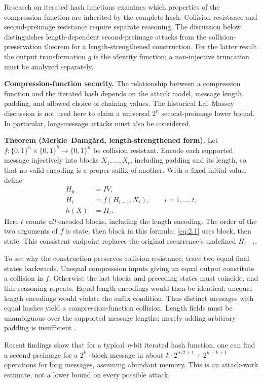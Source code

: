 Research on iterated hash functions examines which properties of the
compression function are inherited by the complete hash. Collision
resistance and second-preimage resistance require separate reasoning.
The discussion below distinguishes length-dependent second-preimage
attacks from the collision-preservation theorem for a length-strengthened
construction. For the latter result the output transformation $g$ is the
identity function; a non-injective truncation must be analyzed separately.

\textbf{Compression-function security.} The relationship between a
compression function and the iterated hash depends on the attack model,
message length, padding, and allowed choice of chaining values. The historical
Lai--Massey discussion \cite{ref29} is not used here to claim a universal
$2^n$ second-preimage lower bound. In particular, long-message attacks
\cite{ref11} must also be considered.

\textbf{Theorem (Merkle--Damg\aa rd, length-strengthened form).}
Let $f:\{0,1\}^n\times\{0,1\}^b\to\{0,1\}^n$ be collision resistant.
Encode each supported message injectively into blocks $X_1,\ldots,X_t$,
including padding and its length, so that no valid encoding is a proper
suffix of another. With a fixed initial value, define
\begin{equation}\label{eq:2.2}
\begin{aligned}
H_0&=IV,\\
H_i&=f(H_{i-1},X_i),\qquad i=1,\ldots,t,\\
h(X)&=H_t.
\end{aligned}
\end{equation}
Here $t$ counts \emph{all} encoded blocks, including the length encoding.
The order of the two arguments of $f$ is state, then block in this formula;
\eqref{eq:2.1} uses block, then state. This consistent endpoint replaces the
original recurrence's undefined $H_{t+1}$.

To see why the construction preserves collision resistance, trace two equal
final states backwards. Unequal compression inputs giving an equal output
constitute a collision in $f$. Otherwise the last blocks and preceding states
must coincide, and this reasoning repeats. Equal-length encodings would then
be identical; unequal-length encodings would violate the suffix condition.
Thus distinct messages with equal hashes yield a compression-function
collision. Length fields must be unambiguous over the supported message
lengths; merely adding arbitrary padding is insufficient \cite{ref2,ref15,ref24}.

Recent findings \cite{ref11} show that for a typical
\emph{n}-bit iterated hash function, one can find a second preimage for
a \(2^k\) -block message in about \(k\cdot2^{n/2+1}+2^{n-k+1}\)
operations for long messages, assuming abundant memory. This is an attack-work estimate, not a lower bound on every possible attack.
